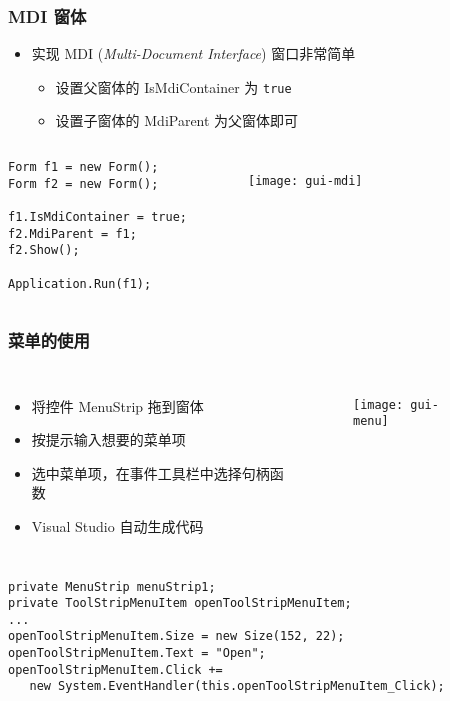 \begin{frame}[fragile]
\frametitle{MDI 窗体}
\begin{itemize}
\item 实现 MDI (\textit{Multi-Document Interface}) 窗口非常简单
  \begin{itemize}
  \item 设置父窗体的 IsMdiContainer 为 \texttt{true}
  \item 设置子窗体的 MdiParent 为父窗体即可
  \end{itemize}
\end{itemize}
\begin{columns}
\begin{lstlisting}
Form f1 = new Form();
Form f2 = new Form();

f1.IsMdiContainer = true;
f2.MdiParent = f1;
f2.Show();

Application.Run(f1);
\end{lstlisting}
  \begin{figure}[htbp]
    \centering
    \texttt{[image: gui-mdi]}
  \end{figure}
\end{columns}
\end{frame}

\begin{frame}[fragile]
\frametitle{菜单的使用}
\begin{columns}
  \begin{itemize}
  \item 将控件 MenuStrip 拖到窗体
  \item 按提示输入想要的菜单项
  \item 选中菜单项，在事件工具栏中选择句柄函数
  \item Visual Studio 自动生成代码
  \end{itemize}
  \begin{figure}[htbp]
    \centering
    \texttt{[image: gui-menu]}
  \end{figure}
\end{columns}
\begin{lstlisting}
private MenuStrip menuStrip1;
private ToolStripMenuItem openToolStripMenuItem;
...
openToolStripMenuItem.Size = new Size(152, 22);
openToolStripMenuItem.Text = "Open";
openToolStripMenuItem.Click += 
   new System.EventHandler(this.openToolStripMenuItem_Click);
\end{lstlisting}
\end{frame}

